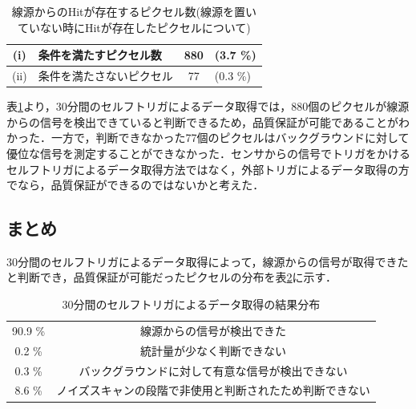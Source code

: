 \begin{table}[h]
  \centering
  \caption{線源からのHitが存在するピクセル数(線源を置いていない時にHitが存在したピクセルについて)}
  \begin{tabular}{|cl|cl|} \hline
    (i) & 条件を満たすピクセル数 & 880 & (3.7 \%) \\ \hline
    (ii) & 条件を満たさないピクセル & 77 & (0.3 \%) \\ \hline
  \end{tabular}
  \label{tab:non0dist}
\end{table}

表\ref{tab:non0dist}より，30分間のセルフトリガによるデータ取得では，880個のピクセルが線源からの信号を検出できていると判断できるため，品質保証が可能であることがわかった．一方で，判断できなかった77個のピクセルはバックグラウンドに対して優位な信号を測定することができなかった．センサからの信号でトリガをかけるセルフトリガによるデータ取得方法ではなく，外部トリガによるデータ取得の方でなら，品質保証ができるのではないかと考えた．

\subsection*{まとめ}
30分間のセルフトリガによるデータ取得によって，線源からの信号が取得できたと判断でき，品質保証が可能だったピクセルの分布を表\ref{tab:selfconc}に示す．

\begin{table}[h]
  \centering
  \caption{30分間のセルフトリガによるデータ取得の結果分布}
  \label{tab:selfconc}
  \begin{tabular}{cc} \hline
    90.9 \% & 線源からの信号が検出できた \\
    0.2 \% & 統計量が少なく判断できない \\
    0.3 \% & バックグラウンドに対して有意な信号が検出できない \\
    8.6 \% & ノイズスキャンの段階で非使用と判断されたため判断できない \\ \hline
  \end{tabular}
\end{table}

    

